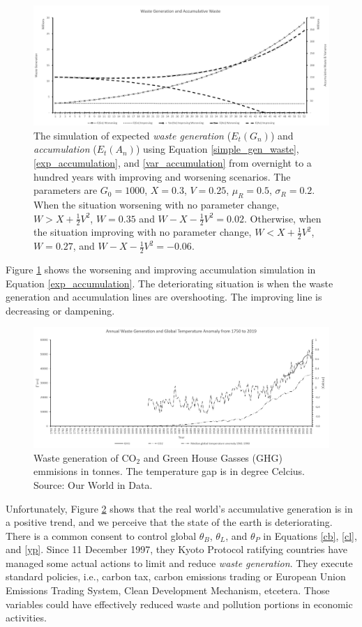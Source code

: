 \documentclass[sn-basic]{sn-jnl}%
\theoremstyle{thmstyleone}%
\theoremstyle{thmstyletwo}%
\theoremstyle{thmstylethree}%
\begin{document}
\begin{figure}[h!]
	\centering
	\includegraphics[width=1.0\textwidth]{Fig2_BW}
	\caption{The simulation of expected \emph{waste generation} ($E_t\left(G_n\right)$) and \emph{accumulation} ($E_t\left(A_n\right)$) using Equation \ref{simple_gen_waste}, \ref{exp_accumulation}, and \ref{var_accumulation} from overnight to a hundred years with improving and worsening scenarios. The parameters are $G_0=1000$, $X=0.3$, $V=0.25$, $\mu_R=0.5$, $\sigma_R=0.2$. When the situation worsening with no parameter change, $W>X+\frac{1}{2}V^2$, $W=0.35$ and $W-X-\frac{1}{2}V^2=0.02$. Otherwise, when the situation improving with no parameter change, $W<X+\frac{1}{2}V^2$, $W=0.27$, and $W-X-\frac{1}{2}V^2=-0.06$.}
	\label{fig2}
\end{figure}
Figure \ref{fig2} shows the worsening and improving accumulation simulation in Equation \ref{exp_accumulation}. The deteriorating situation is when the waste generation and accumulation lines are overshooting. The improving line is decreasing or dampening.

\begin{figure}[h!]
	\centering
	\includegraphics[width=1.0\textwidth]{Waste_Gen_Pic_BW}
	\caption{Waste generation of CO$_2$ and Green House Gasses (GHG) emmisions in tonnes. The temperature gap is in degree Celcius. Source: Our World in Data.}
	\label{fig_waste_gen}
\end{figure}
Unfortunately, Figure \ref{fig_waste_gen} shows that the real world’s accumulative generation is in a positive trend, and we perceive that the state of the earth is deteriorating. There is a common consent to control global $\theta_B$, $\theta_L$, and $\theta_P$ in Equations \ref{cb}, \ref{cl}, and \ref{yp}. Since 11 December 1997, they Kyoto Protocol ratifying countries have managed some actual actions to limit and reduce \emph{waste generation}. They execute standard policies, i.e., carbon tax, carbon emissions trading or European Union Emissions Trading System, Clean Development Mechanism, etcetera. Those variables could have effectively reduced waste and pollution portions in economic activities.
	
\end{document}

